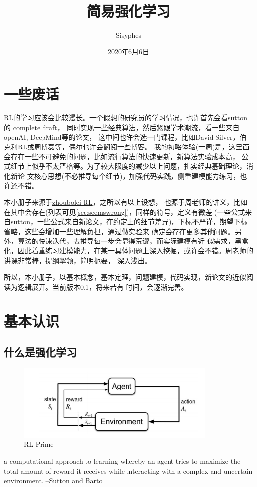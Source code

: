 \documentclass[UTF8]{ctexart}
\title{简易强化学习}
\author{Sisyphes}
\date{2020年6月6日}
\begin{document}
\maketitle
\tableofcontents
\newpage

\section{一些废话}

RL的学习应该会比较漫长。一个假想的研究员的学习情况，也许首先会看sutton的 complete draft，
同时实现一些经典算法，然后紧跟学术潮流，看一些来自openAI, DeepMind等的论文，
这中间也许会选一门课程，比如David Silver，伯克利RL或周博磊等，偶尔也许会翻阅一些博客。
我的初略体验(一周)是，这里面会存在一些不可避免的问题，比如流行算法的快速更新，新算法实验成本高，
公式细节上似乎不太严格等。为了较大限度的减少以上问题，扎实经典基础理论，消化新论
文核心思想(不必推导每个细节)，加强代码实践，侧重建模能力练习，也许还不错。

本小册子来源于\href{https://github.com/zhoubolei/introRL}{zhoubolei RL}，之所以有以上设想，
也源于周老师的讲义，比如在其中会存在(列表可见\ref{sec:seemswrong})，同样的符号，定义有微差
(一些公式来自sutton，一些公式来自新论文，在约定上的细节差异)，下标不严谨，期望下标省略，这些会增加一些理解负担，通过做实验来
确定会存在更多其他问题。另外，算法的快速迭代，去推导每一步会显得荒谬，而实际建模有近
似需求，黑盒化，因此着重练习建模能力，在某一具体问题上深入挖掘，或许会不错。周老师的讲课非常棒，提纲挈领，简明扼要，
深入浅出。

所以，本小册子，以基本概念，基本定理，问题建模，代码实现，新论文的近似阅读为逻辑展开。当前版本0.1，将来若有
时间，会逐渐完善。

\newpage
\section{基本认识}
\subsection{什么是强化学习}

\begin{figure}[htbp]
	\centering
	\includegraphics[width=9.7cm, height=3.7cm]{./pic/rl.png}
    \caption{RL Prime}
    \label{subrl1}
\end{figure}
a computational approach to learning whereby an agent tries
to maximize the total amount of reward it receives while
interacting with a complex and uncertain environment. --Sutton and Barto
\end{document}
